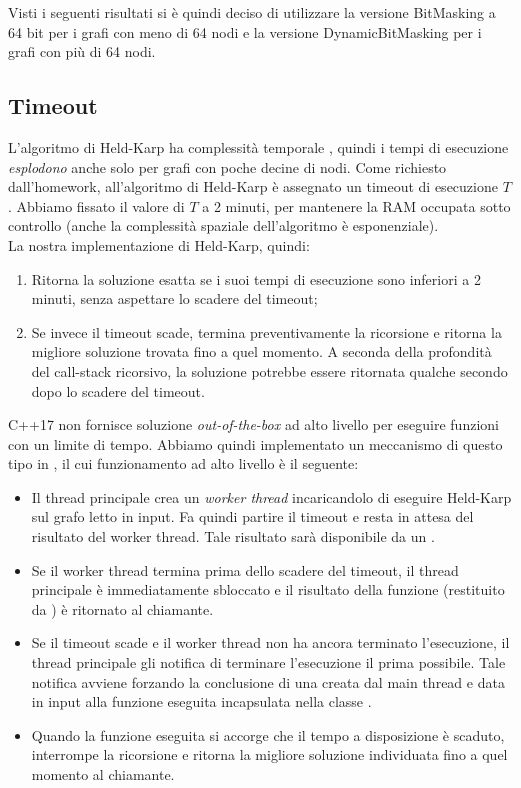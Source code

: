 Visti i seguenti risultati si è quindi deciso di utilizzare la versione BitMasking a 64 bit per i grafi con meno di 64 nodi e la versione DynamicBitMasking per i grafi con più di 64 nodi.

\subsection{Timeout}

\noindent L'algoritmo di Held-Karp ha complessità temporale \complexityHeldKarpTime{}, quindi i tempi di esecuzione \textit{esplodono} anche solo per grafi con poche decine di nodi. Come richiesto dall'homework, all'algoritmo di Held-Karp è assegnato un timeout di esecuzione $T$. Abbiamo fissato il valore di $T$ a 2 minuti, per mantenere la RAM occupata sotto controllo (anche la complessità spaziale dell'algoritmo è esponenziale).\\

\noindent La nostra implementazione di Held-Karp, quindi:

\begin{enumerate}
    \item Ritorna la soluzione esatta se i suoi tempi di esecuzione sono inferiori a 2 minuti, senza aspettare lo scadere del timeout;
    \item Se invece il timeout scade, termina preventivamente la ricorsione e ritorna la migliore soluzione trovata fino a quel momento. A seconda della profondità del call-stack ricorsivo, la soluzione potrebbe essere ritornata qualche secondo dopo lo scadere del timeout.
\end{enumerate}

\noindent C++17 non fornisce soluzione \textit{out-of-the-box} ad alto livello per eseguire funzioni con un limite di tempo. Abbiamo quindi implementato un meccanismo di questo tipo in , il cui funzionamento ad alto livello è il seguente:

\begin{itemize}
    \item Il thread principale crea un \textit{worker thread} incaricandolo di eseguire Held-Karp sul grafo letto in input. Fa quindi partire il timeout e resta in attesa del risultato del worker thread. Tale risultato sarà disponibile da un .
    \item Se il worker thread termina prima dello scadere del timeout, il thread principale è immediatamente sbloccato e il risultato della funzione (restituito da ) è ritornato al chiamante.
    \item Se il timeout scade e il worker thread non ha ancora terminato l'esecuzione, il thread principale gli notifica di terminare l'esecuzione il prima possibile. Tale notifica avviene forzando la conclusione di una  creata dal main thread e data in input alla funzione eseguita incapsulata nella classe .
    \item Quando la funzione eseguita si accorge che il tempo a disposizione è scaduto, interrompe la ricorsione e ritorna la migliore soluzione individuata fino a quel momento al chiamante.
\end{itemize}
